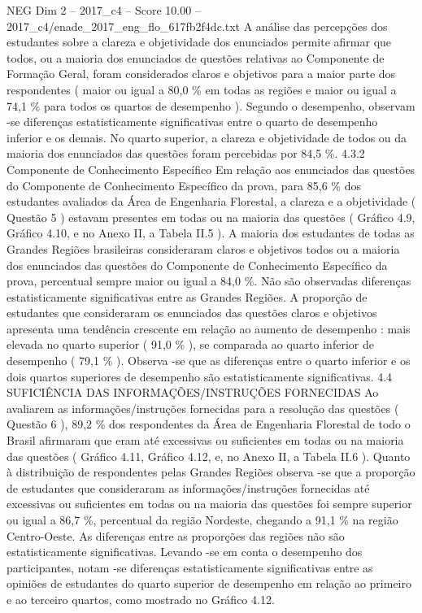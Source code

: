 \begin{textsample}{NEG Dim 2 – 2017\_c4 – Score 10.00 – 2017\_c4/enade\_2017\_eng\_flo\_617fb2f4dc.txt}
A análise das percepções dos estudantes sobre a clareza e objetividade dos enunciados permite afirmar que todos, ou a maioria dos enunciados de questões relativas ao Componente de Formação Geral, foram considerados claros e objetivos para a maior parte dos respondentes ( maior ou igual a 80,0 \% em todas as regiões e maior ou igual a 74,1 \% para todos os quartos de desempenho ).
Segundo o desempenho, observam -se diferenças estatisticamente significativas entre o quarto de desempenho inferior e os demais.
No quarto superior, a clareza e objetividade de todos ou da maioria dos enunciados das questões foram percebidas por 84,5 \%. 4.3.2 Componente de Conhecimento Específico Em relação aos enunciados das questões do Componente de Conhecimento Específico da prova, para 85,6 \% dos estudantes avaliados da Área de Engenharia Florestal, a clareza e a objetividade ( Questão 5 ) estavam presentes em todas ou na maioria das questões ( Gráfico 4.9, Gráfico 4.10, e no Anexo II, a Tabela II.5 ).
A maioria dos estudantes de todas as Grandes Regiões brasileiras consideraram claros e objetivos todos ou a maioria dos enunciados das questões do Componente de Conhecimento Específico da prova, percentual sempre maior ou igual a 84,0 \%.
Não são observadas diferenças estatisticamente significativas entre as Grandes Regiões.
A proporção de estudantes que consideraram os enunciados das questões claros e objetivos apresenta uma tendência crescente em relação ao aumento de desempenho : mais elevada no quarto superior ( 91,0 \% ), se comparada ao quarto inferior de desempenho ( 79,1 \% ).
Observa -se que as diferenças entre o quarto inferior e os dois quartos superiores de desempenho são estatisticamente significativas. 4.4 SUFICIÊNCIA DAS INFORMAÇÕES/INSTRUÇÕES FORNECIDAS Ao avaliarem as informações/instruções fornecidas para a resolução das questões ( Questão 6 ), 89,2 \% dos respondentes da Área de Engenharia Florestal de todo o Brasil afirmaram que eram até excessivas ou suficientes em todas ou na maioria das questões ( Gráfico 4.11, Gráfico 4.12, e, no Anexo II, a Tabela II.6 ).
Quanto à distribuição de respondentes pelas Grandes Regiões observa -se que a proporção de estudantes que consideraram as informações/instruções fornecidas até excessivas ou suficientes em todas ou na maioria das questões foi sempre superior ou igual a 86,7 \%, percentual da região Nordeste, chegando a 91,1 \% na região Centro-Oeste.
As diferenças entre as proporções das regiões não são estatisticamente significativas.
Levando -se em conta o desempenho dos participantes, notam -se diferenças estatisticamente significativas entre as opiniões de estudantes do quarto superior de desempenho em relação ao primeiro e ao terceiro quartos, como mostrado no Gráfico 4.12.

\end{textsample}
